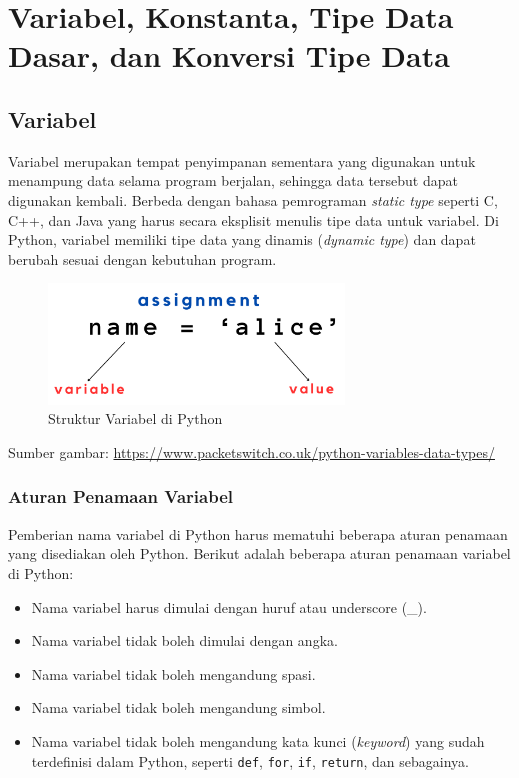 \chapter{Variabel, Konstanta, Tipe Data Dasar, dan Konversi Tipe Data}

\section{Variabel}

Variabel merupakan tempat penyimpanan sementara yang digunakan untuk menampung data selama program berjalan, sehingga data tersebut dapat digunakan kembali. Berbeda dengan bahasa pemrograman \textit{static type} seperti C, C++, dan Java yang harus secara eksplisit menulis tipe data untuk variabel. Di Python, variabel memiliki tipe data yang dinamis (\textit{dynamic type}) dan dapat berubah sesuai dengan kebutuhan program.
\newline

\begin{figure}[H]
	\centering
	\includegraphics[width=0.7\textwidth]{../shared_assets/images/python_variable_structure.png}
	\caption{Struktur Variabel di Python}
	\label{fig:python-variable-structure}
\end{figure}

\noindent
Sumber gambar: \url{https://www.packetswitch.co.uk/python-variables-data-types/}

\subsection{Aturan Penamaan Variabel}

Pemberian nama variabel di Python harus mematuhi beberapa aturan penamaan yang disediakan oleh Python. Berikut adalah beberapa aturan penamaan variabel di Python:

\begin{itemize}
	\item Nama variabel harus dimulai dengan huruf atau underscore (\_).
	\item Nama variabel tidak boleh dimulai dengan angka.
	\item Nama variabel tidak boleh mengandung spasi.
	\item Nama variabel tidak boleh mengandung simbol.
	\item Nama variabel tidak boleh mengandung kata kunci (\textit{keyword}) yang sudah terdefinisi dalam Python, seperti \texttt{def}, \texttt{for}, \texttt{if}, \texttt{return}, dan sebagainya.
\end{itemize}

